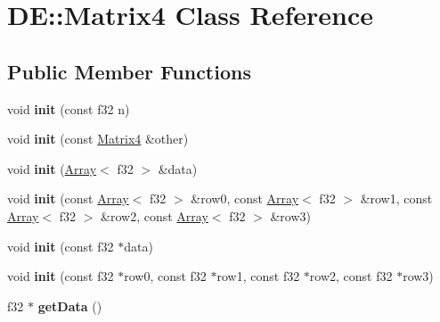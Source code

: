 \hypertarget{classDE_1_1Matrix4}{}\section{DE\+:\+:Matrix4 Class Reference}
\label{classDE_1_1Matrix4}
\subsection*{Public Member Functions}
\begin{DoxyCompactItemize}
\item 
void {\bfseries init} (const f32 n)\hypertarget{classDE_1_1Matrix4_a53c022b60ac40a372975f44b5e8839be}{}\label{classDE_1_1Matrix4_a53c022b60ac40a372975f44b5e8839be}

\item 
void {\bfseries init} (const \hyperlink{classDE_1_1Matrix4}{Matrix4} \&other)\hypertarget{classDE_1_1Matrix4_aa1c73280d1b281d32bcea3a9274212ec}{}\label{classDE_1_1Matrix4_aa1c73280d1b281d32bcea3a9274212ec}

\item 
void {\bfseries init} (\hyperlink{classDE_1_1Array}{Array}$<$ f32 $>$ \&data)\hypertarget{classDE_1_1Matrix4_a5098d65cbdfdbc3274746323b4215483}{}\label{classDE_1_1Matrix4_a5098d65cbdfdbc3274746323b4215483}

\item 
void {\bfseries init} (const \hyperlink{classDE_1_1Array}{Array}$<$ f32 $>$ \&row0, const \hyperlink{classDE_1_1Array}{Array}$<$ f32 $>$ \&row1, const \hyperlink{classDE_1_1Array}{Array}$<$ f32 $>$ \&row2, const \hyperlink{classDE_1_1Array}{Array}$<$ f32 $>$ \&row3)\hypertarget{classDE_1_1Matrix4_a41e8c30ef495235da98c5644aca35c20}{}\label{classDE_1_1Matrix4_a41e8c30ef495235da98c5644aca35c20}

\item 
void {\bfseries init} (const f32 $\ast$data)\hypertarget{classDE_1_1Matrix4_a534540f5569b22de93aff2c8f8929c1e}{}\label{classDE_1_1Matrix4_a534540f5569b22de93aff2c8f8929c1e}

\item 
void {\bfseries init} (const f32 $\ast$row0, const f32 $\ast$row1, const f32 $\ast$row2, const f32 $\ast$row3)\hypertarget{classDE_1_1Matrix4_abccd141001cd1fdbe62f01d1cb5d912d}{}\label{classDE_1_1Matrix4_abccd141001cd1fdbe62f01d1cb5d912d}

\item 
f32 $\ast$ {\bfseries get\+Data} ()\hypertarget{classDE_1_1Matrix4_af586b32a6b6e82b0ac4b896fcc41a014}{}\label{classDE_1_1Matrix4_af586b32a6b6e82b0ac4b896fcc41a014}


\end{DoxyCompactItemize}
